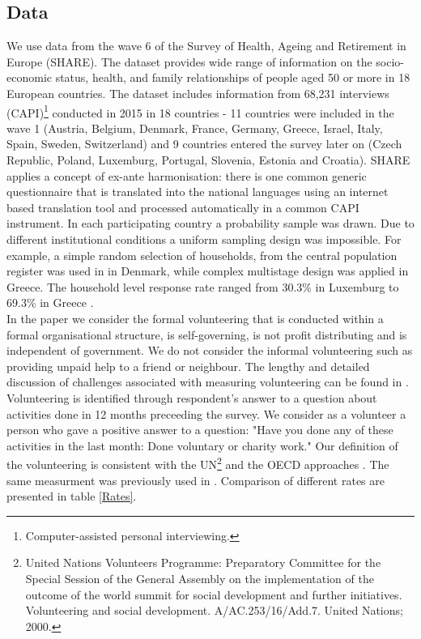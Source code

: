 \documentclass[10pt, letterpaper]{article}
\begin{document}
\begin{spacing}{1.4}
\section{Data}

We use data from the wave 6 of the Survey of Health, Ageing and Retirement in Europe (SHARE). The dataset provides wide range of information on the socio-economic status, health, and family relationships of people aged 50 or more in 18 European countries. The dataset includes information from 68,231 interviews (CAPI)\footnote{Computer-assisted personal interviewing.} conducted in 2015 in 18 countries - 11 countries were included in the wave 1 (Austria, Belgium, Denmark, France, Germany, Greece, Israel, Italy, Spain, Sweden, Switzerland) and 9 countries entered the survey later on (Czech Republic, Poland, Luxemburg,  Portugal, Slovenia, Estonia and Croatia). SHARE applies a concept of ex-ante harmonisation: there is one common generic questionnaire that is translated into the national languages using an internet based translation tool and processed automatically in a common CAPI instrument. In each participating country a probability sample was drawn. Due to different institutional conditions a uniform sampling design was impossible. For example, a simple random selection of households, from the central population register was used in in Denmark, while complex multistage design was applied in Greece. The  household level response rate ranged from 30.3\% in Luxemburg to 69.3\% in Greece \citep{bergmann17}. \\
In the paper we consider the formal volunteering that is conducted within a formal organisational structure, is self-governing, is not profit distributing and is independent of government. We do not consider the informal volunteering such as providing unpaid help to a friend or neighbour. The lengthy and detailed discussion of challenges associated with measuring volunteering can be found in \citet{salomon2017}. Volunteering is identified through respondent's answer to a question about activities done in 12 months preceeding the survey. We consider as a volunteer a person who gave a positive answer to a question: "Have you done any of these activities in the last month: Done voluntary or charity work."  Our definition of the volunteering is consistent with the UN\footnote{United Nations Volunteers Programme: Preparatory Committee for the Special Session of the General Assembly on the implementation of the outcome of the world summit for social development and further initiatives. Volunteering and social development. A/AC.253/16/Add.7. United Nations; 2000.} and the OECD approaches \citep{Oecd15,Oecd16}. The same measurment was previously used in \citet{haski09}. Comparison of different rates are presented in table \ref{Rates}. \\ 


\end{spacing}
\end{document}
